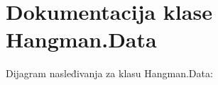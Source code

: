 \hypertarget{classHangman_1_1Data}{}\section{Dokumentacija klase Hangman.\+Data}
\label{classHangman_1_1Data}


Dijagram nasleđivanja za klasu Hangman.\+Data\+:
